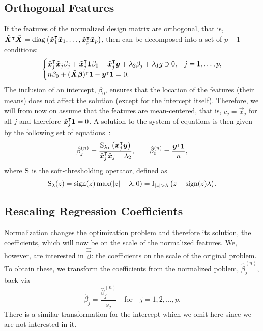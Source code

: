 \subsection{Orthogonal Features}

If the features of the normalized design matrix are orthogonal, that is, \(\tilde{\boldsymbol{X}}^\intercal \tilde{\boldsymbol{X}} = \operatorname{diag}\left(\tilde{\boldsymbol{x}}_1^\intercal \tilde{\boldsymbol{x}}_1, \dots, \tilde{\boldsymbol{x}}_p^\intercal \tilde{\boldsymbol{x}}_p\right) \), then  can be decomposed into a set of \(p + 1\) conditions:
\[
  \begin{cases}
    \tilde{\boldsymbol{x}}_j^\intercal \tilde{\boldsymbol{x}}_j \beta_j + \tilde{\boldsymbol{x}}_j^\intercal \boldsymbol{1} \beta_0 - \tilde{\boldsymbol{x}}_j^\intercal\boldsymbol{y} + \lambda_2 \beta_j + \lambda_1 g \ni 0, & j=1,\dots,p, \\
    n \beta_0 + (\tilde{\boldsymbol{X}}\boldsymbol{\beta})^\intercal \boldsymbol{1} -  \boldsymbol{y}^\intercal \boldsymbol{1} = 0.
  \end{cases}
\]
The inclusion of an intercept, \(\beta_0\), ensures that the location of the
features (their means) does not affect the solution (except for the intercept itself). Therefore,
we will from now on assume that the features are mean-centered, that is, \(c_j = \bar{\vec{x}}_j\) for all \(j\) and therefore \(\tilde{\boldsymbol{x}}_j^\intercal \boldsymbol{1} = 0\). A solution to the system of equations is then given by the following set of equations~\citep{donoho1994}:
\begin{equation*}
  \label{eq:orthogonal-solution-normalized}
  \hat{\beta}^{(n)}_j = \frac{\operatorname{S}_{\lambda_1}\left(\tilde{\boldsymbol{x}}_j^\intercal \boldsymbol{y}\right)}{\tilde{\boldsymbol{x}}_j^\intercal \tilde{\boldsymbol{x}}_j + \lambda_2},
  \qquad
  \hat{\beta}_0^{(n)} = \frac{\boldsymbol{y}^\intercal \boldsymbol{1}}{n},
\end{equation*}
where \(\operatorname{S}\) is the soft-thresholding operator, defined as
\[
  \st_\lambda(z) = \sign(z) \max(|z| - \lambda, 0) = \ind{|z|>\lambda}\big(z - \sign(z)\lambda\big).
\]

\subsection{Rescaling Regression Coefficients}

Normalization changes the optimization problem and therefore its solution, the coefficients, which will now be on the scale of the normalized features. We, however, are interested in \(\hat{\vec{\beta}}\): the coefficients on the scale of the original problem. To obtain these, we transform the coefficients from the normalized poblem, \(\hat\beta^{(n)}_j\), back via
\begin{equation}
  \label{eq:orthogonal-solution}
  \hat\beta_j = \frac{\hat\beta^{(n)}_j}{s_j} \quad\text{for}\quad j = 1,2,\dots,p.
\end{equation}
There is a similar transformation for the intercept which we omit here since we are not interested in it.

